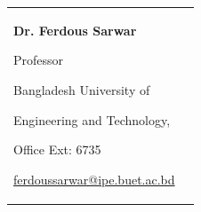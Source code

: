 

\begin{tabularx}{\textwidth}{@{}X X@{}}
\textbf{Dr. Ferdous Sarwar}
    \par Professor
    \par Bangladesh University of

    Engineering and Technology,
    \par Office Ext: 6735
    \par \href{mailto:ferdoussarwar@ipe.buet.ac.bd}{ferdoussarwar@ipe.buet.ac.bd}


\\
\end{tabularx}
